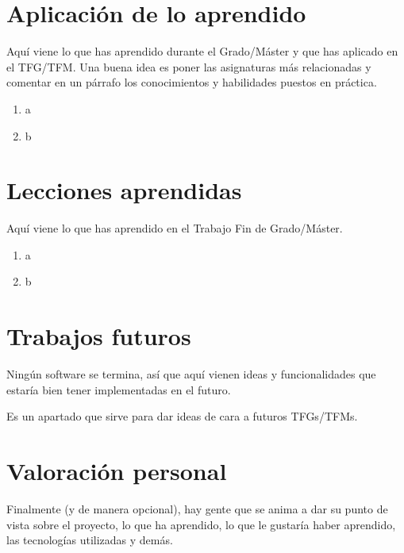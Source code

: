 \documentclass[a4paper, 12pt]{book}
\begin{document}
\section{Aplicación de lo aprendido}
\label{sec:aplicacion}

Aquí viene lo que has aprendido durante el Grado/Máster y que has aplicado
en el TFG/TFM. Una buena idea es poner las asignaturas más relacionadas y
comentar en un párrafo los conocimientos y habilidades puestos en práctica.

\begin{enumerate}
  \item a
  \item b
\end{enumerate}


\section{Lecciones aprendidas}
\label{sec:lecciones_aprendidas}

Aquí viene lo que has aprendido en el Trabajo Fin de Grado/Máster.

\begin{enumerate}
  \item a
  \item b
\end{enumerate}


\section{Trabajos futuros}
\label{sec:trabajos_futuros}

Ningún software se termina, así que aquí vienen ideas y funcionalidades
que estaría bien tener implementadas en el futuro.

Es un apartado que sirve para dar ideas de cara a futuros TFGs/TFMs.


\section{Valoración personal}
\label{sec:valoracion}

Finalmente (y de manera opcional), hay gente que se anima a dar su punto de
vista sobre el proyecto, lo que ha aprendido, lo que le gustaría haber aprendido,
las tecnologías utilizadas y demás.



\end{document}
